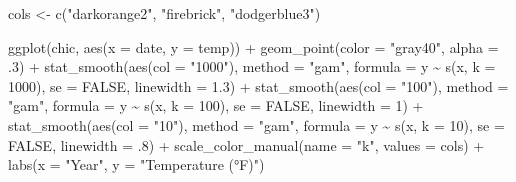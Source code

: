 \documentclass[
  letterpaper,
  DIV=11,
  numbers=noendperiod]{scrreprt}
\newenvironment{Shaded}{\begin{snugshade}}{\end{snugshade}}
\newcommand{\AttributeTok}[1]{\textcolor[rgb]{0.40,0.45,0.13}{#1}}
\newcommand{\ConstantTok}[1]{\textcolor[rgb]{0.56,0.35,0.01}{#1}}
\newcommand{\DecValTok}[1]{\textcolor[rgb]{0.68,0.00,0.00}{#1}}
\newcommand{\FloatTok}[1]{\textcolor[rgb]{0.68,0.00,0.00}{#1}}
\newcommand{\FunctionTok}[1]{\textcolor[rgb]{0.28,0.35,0.67}{#1}}
\newcommand{\NormalTok}[1]{\textcolor[rgb]{0.00,0.23,0.31}{#1}}
\newcommand{\OtherTok}[1]{\textcolor[rgb]{0.00,0.23,0.31}{#1}}
\newcommand{\SpecialCharTok}[1]{\textcolor[rgb]{0.37,0.37,0.37}{#1}}
\newcommand{\StringTok}[1]{\textcolor[rgb]{0.13,0.47,0.30}{#1}}
\begin{document}
\begin{Shaded}
\begin{Highlighting}[]
\NormalTok{cols }\OtherTok{\textless{}{-}} \FunctionTok{c}\NormalTok{(}\StringTok{"darkorange2"}\NormalTok{, }\StringTok{"firebrick"}\NormalTok{, }\StringTok{"dodgerblue3"}\NormalTok{)}

\FunctionTok{ggplot}\NormalTok{(chic, }\FunctionTok{aes}\NormalTok{(}\AttributeTok{x =}\NormalTok{ date, }\AttributeTok{y =}\NormalTok{ temp)) }\SpecialCharTok{+}
  \FunctionTok{geom\_point}\NormalTok{(}\AttributeTok{color =} \StringTok{"gray40"}\NormalTok{, }\AttributeTok{alpha =}\NormalTok{ .}\DecValTok{3}\NormalTok{) }\SpecialCharTok{+}
  \FunctionTok{stat\_smooth}\NormalTok{(}\FunctionTok{aes}\NormalTok{(}\AttributeTok{col =} \StringTok{"1000"}\NormalTok{),}
              \AttributeTok{method =} \StringTok{"gam"}\NormalTok{,}
              \AttributeTok{formula =}\NormalTok{ y }\SpecialCharTok{\textasciitilde{}} \FunctionTok{s}\NormalTok{(x, }\AttributeTok{k =} \DecValTok{1000}\NormalTok{),}
              \AttributeTok{se =} \ConstantTok{FALSE}\NormalTok{, }\AttributeTok{linewidth =} \FloatTok{1.3}\NormalTok{) }\SpecialCharTok{+}
  \FunctionTok{stat\_smooth}\NormalTok{(}\FunctionTok{aes}\NormalTok{(}\AttributeTok{col =} \StringTok{"100"}\NormalTok{),}
              \AttributeTok{method =} \StringTok{"gam"}\NormalTok{,}
              \AttributeTok{formula =}\NormalTok{ y }\SpecialCharTok{\textasciitilde{}} \FunctionTok{s}\NormalTok{(x, }\AttributeTok{k =} \DecValTok{100}\NormalTok{),}
              \AttributeTok{se =} \ConstantTok{FALSE}\NormalTok{, }\AttributeTok{linewidth =} \DecValTok{1}\NormalTok{) }\SpecialCharTok{+}
  \FunctionTok{stat\_smooth}\NormalTok{(}\FunctionTok{aes}\NormalTok{(}\AttributeTok{col =} \StringTok{"10"}\NormalTok{),}
              \AttributeTok{method =} \StringTok{"gam"}\NormalTok{,}
              \AttributeTok{formula =}\NormalTok{ y }\SpecialCharTok{\textasciitilde{}} \FunctionTok{s}\NormalTok{(x, }\AttributeTok{k =} \DecValTok{10}\NormalTok{),}
              \AttributeTok{se =} \ConstantTok{FALSE}\NormalTok{, }\AttributeTok{linewidth =}\NormalTok{ .}\DecValTok{8}\NormalTok{) }\SpecialCharTok{+}
  \FunctionTok{scale\_color\_manual}\NormalTok{(}\AttributeTok{name =} \StringTok{"k"}\NormalTok{, }\AttributeTok{values =}\NormalTok{ cols) }\SpecialCharTok{+}
  \FunctionTok{labs}\NormalTok{(}\AttributeTok{x =} \StringTok{"Year"}\NormalTok{, }\AttributeTok{y =} \StringTok{"Temperature (°F)"}\NormalTok{)}
\end{Highlighting}
\end{Shaded}
\end{document}
